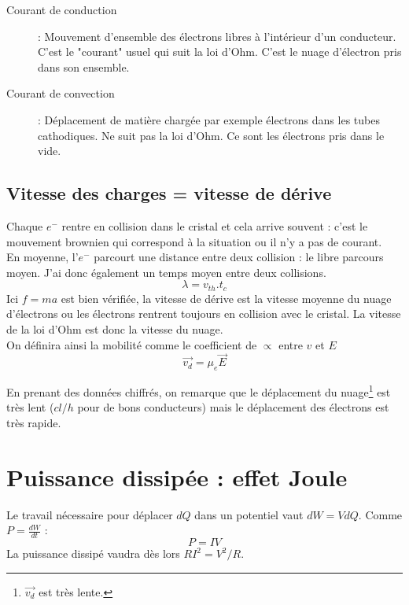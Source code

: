 \documentclass[british,french,11pt, a4paper, openany]{book}
\begin{document}
		
		\begin{description}
			\item[Courant de conduction] : Mouvement d'ensemble des électrons libres à l'intérieur d'un conducteur. C'est le "courant" usuel qui suit la loi d'Ohm. C'est le nuage d'électron pris dans son ensemble.
			\item[Courant de convection] : Déplacement de matière chargée par exemple électrons dans les tubes cathodiques. Ne suit pas la loi d'Ohm. Ce sont les électrons pris dans le vide.
		\end{description}
		
		
		\subsection{Vitesse des charges = vitesse de dérive}
		Chaque $e^-$ rentre en collision dans le cristal et cela arrive souvent : c'est le mouvement brownien qui correspond à la situation ou il n'y a pas de courant. \\
		En moyenne, l'$e^-$ parcourt une distance entre deux collision : le libre parcours moyen. J'ai donc également un temps moyen entre deux collisions.
		\begin{equation}
		\lambda = v_{th}.t_c
		\end{equation}
		Ici $f=ma$ est bien vérifiée, la vitesse de dérive est la vitesse moyenne du nuage d'électrons ou les électrons rentrent toujours en collision avec le cristal. La vitesse de la loi d'Ohm est donc la vitesse du nuage.\\
		On définira ainsi la mobilité comme le coefficient de $\propto$ entre $v$ et $E$
		\begin{equation}
		\vec{v_d} = \mu_e\vec{E}
		\end{equation}
		
		En prenant des données chiffrés, on remarque que le déplacement du nuage\footnote{$\vec{v_d}$ est très lente.} est très lent ($cl/h$ pour de bons conducteurs) mais le déplacement des électrons est très rapide.
		
		\section{Puissance dissipée : effet Joule}
		Le travail nécessaire pour déplacer $dQ$ dans un potentiel vaut $dW = V dQ$. Comme $P = \frac{dW}{dt}$ :
		\begin{equation}
		P = IV
		\end{equation}
		La puissance dissipé vaudra dès lors $RI^2 = V^2/R$.\\
		
\end{document}
